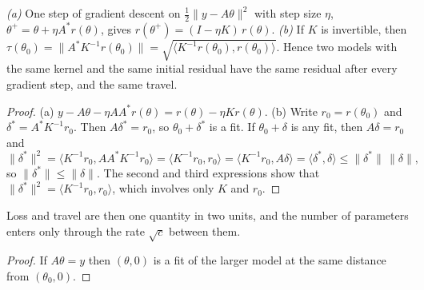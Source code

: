 \begin{theorem}\label{thm:kernel}
\emph{(a)} One step of gradient descent on $\tfrac12\|y-A\theta\|^2$ with step
size $\eta$, $\theta^+=\theta+\eta A^*r(\theta)$, gives
$r(\theta^+)=(I-\eta K)\,r(\theta)$.
\emph{(b)} If $K$ is invertible, then
$\tau(\theta_0)=\|A^*K^{-1}r(\theta_0)\|=\sqrt{\langle K^{-1}r(\theta_0),r(\theta_0)\rangle}$.
Hence two models with the same kernel and the same initial residual have the
same residual after every gradient step, and the same travel.
\end{theorem}

\begin{proof}
(a) $y-A\theta-\eta AA^*r(\theta)=r(\theta)-\eta Kr(\theta)$.
(b) Write $r_0=r(\theta_0)$ and $\delta^\ast=A^*K^{-1}r_0$. Then
$A\delta^\ast=r_0$, so $\theta_0+\delta^\ast$ is a fit. If $\theta_0+\delta$ is
any fit, then $A\delta=r_0$ and
\[
  \|\delta^\ast\|^2=\langle K^{-1}r_0,AA^*K^{-1}r_0\rangle
  =\langle K^{-1}r_0,r_0\rangle=\langle K^{-1}r_0,A\delta\rangle
  =\langle\delta^\ast,\delta\rangle\le\|\delta^\ast\|\,\|\delta\|,
\]
so $\|\delta^\ast\|\le\|\delta\|$. The second and third expressions show that
$\|\delta^\ast\|^2=\langle K^{-1}r_0,r_0\rangle$, which involves only $K$ and
$r_0$.
\end{proof}


Loss and travel are then one quantity in two units, and the number of
parameters enters only through the rate $\sqrt c$ between them.


\begin{proof}
If $A\theta=y$ then $(\theta,0)$ is a fit of the larger model at the same
distance from $(\theta_0,0)$.
\end{proof}

